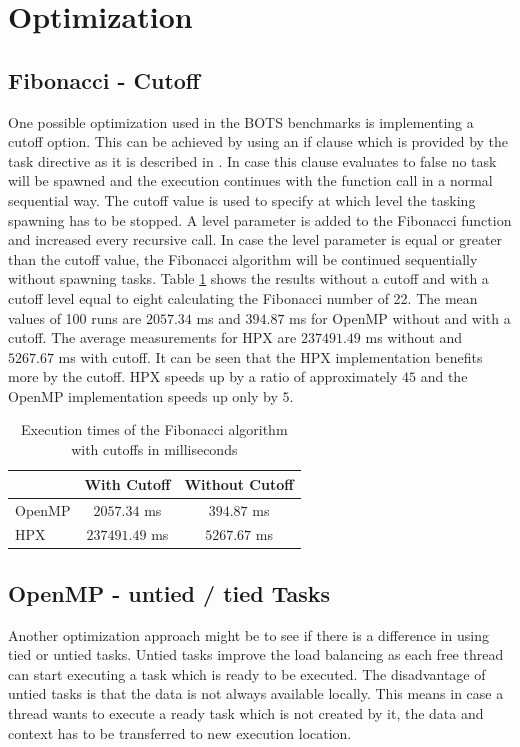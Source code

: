 \section{Optimization}
\label{sec:Opt}
\subsection{Fibonacci - Cutoff}
  One possible optimization used in the BOTS benchmarks is implementing a cutoff option.
  This can be achieved by using an if clause which is provided by the task directive as it is described in \cite{MKlemm.2018}.
  In case this clause evaluates to false no task will be spawned and the execution continues with the function call in a normal sequential way.
  The cutoff value is used to specify at which level the tasking spawning has to be stopped.
  A level parameter is added to the Fibonacci function and increased every recursive call.
  In case the level parameter is equal or greater than the cutoff value, the Fibonacci algorithm will be continued sequentially without spawning tasks. 
  Table \ref{tab:cutoff} shows the results without a cutoff and with a cutoff level equal to eight calculating the Fibonacci number of 22.
  The mean values of 100 runs are \(2057.34\) ms and \(394.87\) ms for OpenMP without and with a cutoff.
The average measurements for HPX are \(237491.49\) ms without and \(5267.67\) ms with cutoff.
It can be seen that the HPX implementation benefits more by the cutoff.
HPX speeds up by a ratio of approximately \(45\) and the OpenMP implementation speeds up only by \(5\).

\begin{table}
\centering
\caption{Execution times of the Fibonacci algorithm with cutoffs in milliseconds}
\begin{tabular}[h]{|l|c|c|}
\hline
 & With Cutoff & Without Cutoff \\\hline
OpenMP & \(2057.34\) ms & \(394.87\) ms \\\hline
HPX & \(237491.49\) ms & \(5267.67\) ms \\\hline
\end{tabular}
\label{tab:cutoff}
\end{table}

\subsection{OpenMP - untied / tied Tasks}
  Another optimization approach might be to see if there is a difference in using tied or untied tasks.
  Untied tasks improve the load balancing as each free thread can start executing a task which is ready to be executed.
  The disadvantage of untied tasks is that the data is not always available locally.
  This means in case a thread wants to execute a ready task which is not created by it, the data and context has to be transferred to new execution location.
  
